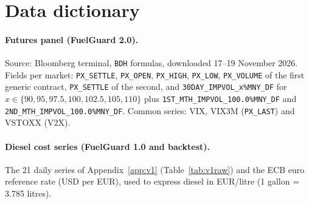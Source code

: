 \section{Data dictionary}\label{app:data}

\begin{sloppypar}
\paragraph{Futures panel (FuelGuard 2.0).} Source: Bloomberg terminal, \texttt{BDH} formulas, downloaded
17--19 November 2026. Fields per market: \texttt{PX\_SETTLE}, \texttt{PX\_OPEN}, \texttt{PX\_HIGH},
\texttt{PX\_LOW}, \texttt{PX\_VOLUME} of the first generic contract, \texttt{PX\_SETTLE} of the second, and
\texttt{30DAY\_IMPVOL\_x\%MNY\_DF} for $x\in\{90,95,97.5,100,102.5,105,110\}$ plus
\texttt{1ST\_MTH\_IMPVOL\_100.0\%MNY\_DF} and \texttt{2ND\_MTH\_IMPVOL\_100.0\%MNY\_DF}. Common series:
VIX, VIX3M (\texttt{PX\_LAST}) and VSTOXX (V2X).
\end{sloppypar}

\begin{table}[H]
\centering\scriptsize
{}
\caption{The 22 markets: market-days with a target, median and 95th percentile of realised volatility
(Garman--Klass, next 21 days, annualised) and median 30-day implied volatility. Government-bond volatilities
are price volatilities.}
\label{tab:markets}
\end{table}

\paragraph{Diesel cost series (FuelGuard 1.0 and backtest).} The 21 daily series of Appendix~\ref{app:v1}
(Table~\ref{tab:v1raw}) and the ECB euro reference rate (USD per EUR), used to express diesel in EUR/litre
(1 gallon = 3.785 litres).

\begin{table}[H]
\centering\scriptsize
{}
\caption{Raw series of FuelGuard 1.0 and the derived diesel price.}
\label{tab:v1raw}
\end{table}
